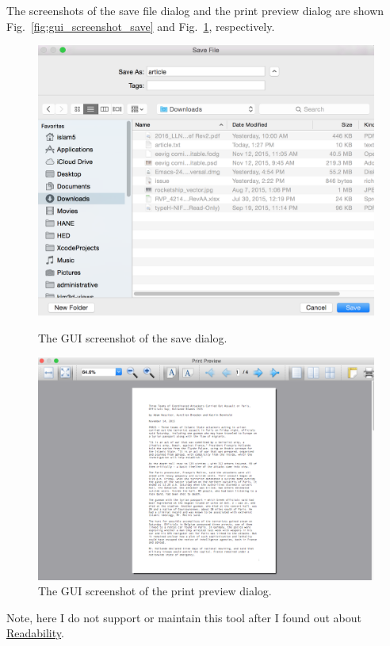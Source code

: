 \documentclass[]{article}
\begin{document}
The screenshots of the save file dialog and the print preview dialog
are shown Fig.~\ref{fig:gui_screenshot_save} and
Fig.~\ref{fig:gui_screenshot_printpreview}, respectively.
\begin{figure}[!ht]
  \begin{minipage}[!ht]{0.4\linewidth}
    \includegraphics[width=\linewidth]{images/gui_screenshot_save.png}
    \caption{The GUI screenshot of the save
      dialog.} \label{fig:gui_screenshot_save}
  \end{minipage} \hfill
  \begin{minipage}[!ht]{0.5\linewidth}
   \includegraphics[width=\linewidth]{images/gui_screenshot_printpreview.png}
    \caption{The GUI screenshot of the print preview
      dialog.} \label{fig:gui_screenshot_printpreview}
  \end{minipage}
\end{figure}
Note, here I do not support or maintain this tool after I found out
about \href{https://www.readability.com}{Readability}.
\end{document}
